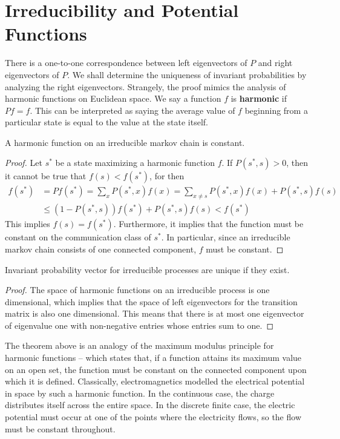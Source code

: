 \section{Irreducibility and Potential Functions}

There is a one-to-one correspondence between left eigenvectors of $P$ and right eigenvectors of $P$. We shall determine the uniqueness of invariant probabilities by analyzing the right eigenvectors. Strangely, the proof mimics the analysis of harmonic functions on Euclidean space. We say a function $f$ is {\bf harmonic} if $Pf = f$. This can be interpreted as saying the average value of $f$ beginning from a particular state is equal to the value at the state itself.

\begin{lemma}
    A harmonic function on an irreducible markov chain is constant.
\end{lemma}
\begin{proof}
    Let $s^*$ be a state maximizing a harmonic function $f$. If $P(s^*, s) > 0$, then it cannot be true that $f(s) < f(s^*)$, for then
    \begin{align*}
        f(s^*) &= Pf(s^*) = \sum_x P(s^*,x) f(x) = \sum_{x \neq s} P(s^*,x) f(x) + P(s^*,s) f(s)\\
        &\leq (1 - P(s^*,s)) f(s^*) + P(s^*,s) f(s) < f(s^*)
    \end{align*}
    This implies $f(s) = f(s^*)$. Furthermore, it implies that the function must be constant on the communication class of $s^*$. In particular, since an irreducible markov chain consists of one connected component, $f$ must be constant.
\end{proof}

\begin{corollary}
    Invariant probability vector for irreducible processes are unique if they exist.
\end{corollary}
\begin{proof}
    The space of harmonic functions on an irreducible process is one dimensional, which implies that the space of left eigenvectors for the transition matrix is also one dimensional. This means that there is at most one eigenvector of eigenvalue one with non-negative entries whose entries sum to one.
\end{proof}

The theorem above is an analogy of the maximum modulus principle for harmonic functions -- which states that, if a function attains its maximum value on an open set, the function must be constant on the connected component upon which it is defined. Classically, electromagnetics modelled the electrical potential in space by such a harmonic function. In the continuous case, the charge distributes itself across the entire space. In the discrete finite case, the electric potential must occur at one of the points where the electricity flows, so the flow must be constant throughout.

